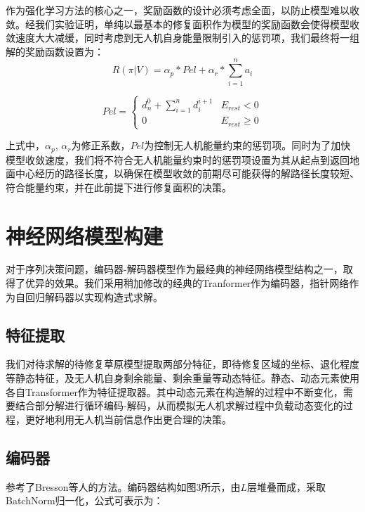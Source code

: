 \documentclass[AutoFakeBold]{LZUThesis}
\begin{document}
作为强化学习方法的核心之一，奖励函数的设计必须考虑全面，以防止模型难以收敛。经我们实验证明，单纯以最基本的修复面积作为模型的奖励函数会使得模型收敛速度大大减缓，同时考虑到无人机自身能量限制引入的惩罚项，我们最终将一组解的奖励函数设置为：
\begin{equation}
	R(\pi|V)=\alpha_{p}*Pel+\alpha_{r}*\sum_{i=1}^{n}a_{i}
	\label{eq:11}
\end{equation}

\begin{equation}
	Pel=\left\{\begin{array}{ll}
		d_{n}^{0}+\sum\limits_{i=1}^{n}d_{i}^{i+1} & E_{rest}<0     \\
		0                                          & E_{rest}\geq 0
	\end{array}\right.
	\label{eq:12}
\end{equation}

上式中，$\alpha_p$, $\alpha_r$为修正系数，$Pel$为控制无人机能量约束的惩罚项。同时为了加快模型收敛速度，我们将不符合无人机能量约束时的惩罚项设置为其从起点到返回地面中心经历的路径长度，以确保在模型收敛的前期尽可能获得的解路径长度较短、符合能量约束，并在此前提下进行修复面积的决策。

\section{神经网络模型构建}

对于序列决策问题，编码器-解码器模型\cite{vaswani2017attention}作为最经典的神经网络模型结构之一，取得了优异的效果。我们采用稍加修改的经典的Tranformer作为编码器，指针网络\cite{vinyals2015pointer}作为自回归解码器以实现构造式求解。

\subsection{特征提取}

我们对待求解的待修复草原模型提取两部分特征，即待修复区域的坐标、退化程度等静态特征，及无人机自身剩余能量、剩余重量等动态特征。静态、动态元素使用各自Transformer作为特征提取器。其中动态元素在构造解的过程中不断变化，需要结合部分解进行循环编码-解码，从而模拟无人机求解过程中负载动态变化的过程，更好地利用无人机当前信息作出更合理的决策。

\subsection{编码器}

参考了Bresson\cite{bresson2021transformer}等人的方法。编码器结构如图3所示，由$L$层堆叠而成，采取BatchNorm归一化，公式可表示为：
\end{document}
